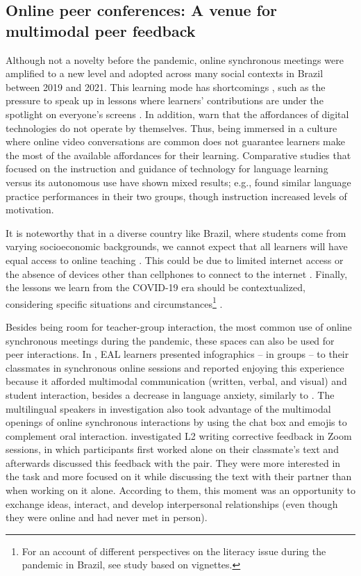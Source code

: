 \documentclass[english]{textolivre}
\begin{document}
\subsection{Online peer conferences: A venue for multimodal peer feedback}

Although not a novelty before the pandemic, online synchronous meetings were amplified to a new level and adopted across many social contexts in Brazil between 2019 and 2021. This learning mode has shortcomings \cite{belda2021enhancing}, such as the pressure to speak up in lessons where learners' contributions are under the spotlight on everyone's screens \cite{yang2021feedback}. In addition, \textcite{elola2017writing} warn that the affordances of digital technologies do not operate by themselves. Thus, being immersed in a culture where online video conversations are common does not guarantee learners make the most of the available affordances for their learning. Comparative studies that focused on the instruction and guidance of technology for language learning versus its autonomous use have shown mixed results; e.g., \textcite{ibanez2021comparative} found similar language practice performances in their two groups, though instruction increased levels of motivation.

It is noteworthy that in a diverse country like Brazil, where students come from varying socioeconomic backgrounds, we cannot expect that all learners will have equal access to online teaching \cite{oliveira2020conteudo}. This could be due to limited internet access or the absence of devices other than cellphones to connect to the internet \cite{de2020uso}. Finally, the lessons we learn from the COVID-19 era should be contextualized, considering specific situations and circumstances\footnote{For an account of different perspectives on the literacy issue during the pandemic in Brazil, see \textcite{tagata2021rethinking} study based on vignettes.} \cite{tagata2021rethinking}.

Besides being room for teacher-group interaction, the most common use of online synchronous meetings during the pandemic, these spaces can also be used for peer interactions. In \textcite{belda2021enhancing}, EAL learners presented infographics – in groups – to their classmates in synchronous online sessions and reported enjoying this experience because it afforded multimodal communication (written, verbal, and visual) and student interaction, besides a decrease in language anxiety, similarly to \textcite{tao2022teaching}. The multilingual speakers in \textcite{svensson2013students} investigation also took advantage of the multimodal openings of online synchronous interactions by using the chat box and emojis to complement oral interaction. \textcite{payant2022learners} investigated L2 writing corrective feedback in Zoom sessions, in which participants first worked alone on their classmate’s text and afterwards discussed this feedback with the pair. They were more interested in the task and more focused on it while discussing the text with their partner than when working on it alone. According to them, this moment was an opportunity to exchange ideas, interact, and develop interpersonal relationships (even though they were online and had never met in person).
\end{document}
